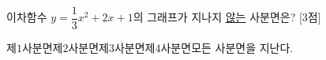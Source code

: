 이차함수 $y=\dfrac{1}{3}x^2+2x+1$의 그래프가 지나지 \underline{않는} 사분면은? \mbox{[3점]}
\begin{choices32}{제$1$사분면}{제$2$사분면}{제$3$사분면}{제$4$사분면}{모든 사분면을 지난다.}\end{choices32}
